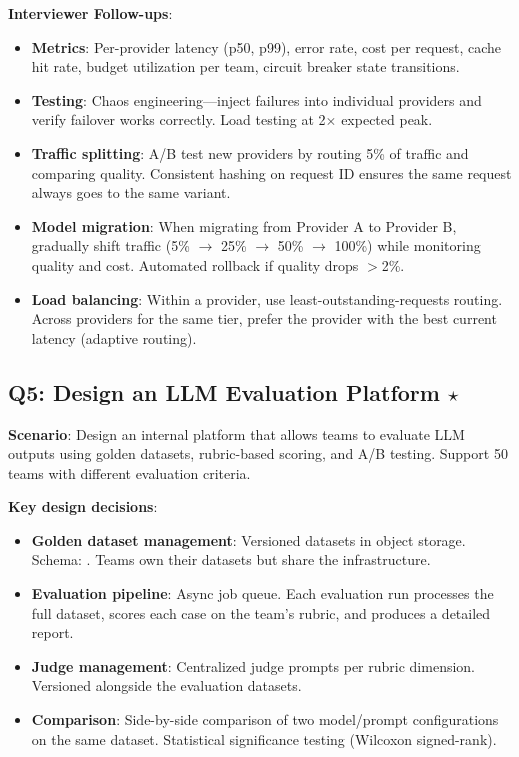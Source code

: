 \textbf{Interviewer Follow-ups}:
\begin{itemize}[leftmargin=*]
    \item \textbf{Metrics}: Per-provider latency (p50, p99), error rate, cost per request, cache hit rate, budget utilization per team, circuit breaker state transitions.
    \item \textbf{Testing}: Chaos engineering---inject failures into individual providers and verify failover works correctly. Load testing at 2$\times$ expected peak.
    \item \textbf{Traffic splitting}: A/B test new providers by routing 5\% of traffic and comparing quality. Consistent hashing on request ID ensures the same request always goes to the same variant.
    \item \textbf{Model migration}: When migrating from Provider A to Provider B, gradually shift traffic (5\% $\to$ 25\% $\to$ 50\% $\to$ 100\%) while monitoring quality and cost. Automated rollback if quality drops $>$2\%.
    \item \textbf{Load balancing}: Within a provider, use least-outstanding-requests routing. Across providers for the same tier, prefer the provider with the best current latency (adaptive routing).
\end{itemize}

\subsection{Q5: Design an LLM Evaluation Platform $\star$}

\textbf{Scenario}: Design an internal platform that allows teams to evaluate LLM outputs using golden datasets, rubric-based scoring, and A/B testing. Support 50 teams with different evaluation criteria.

\textbf{Key design decisions}:
\begin{itemize}[leftmargin=*]
    \item \textbf{Golden dataset management}: Versioned datasets in object storage. Schema: . Teams own their datasets but share the infrastructure.
    \item \textbf{Evaluation pipeline}: Async job queue. Each evaluation run processes the full dataset, scores each case on the team's rubric, and produces a detailed report.
    \item \textbf{Judge management}: Centralized judge prompts per rubric dimension. Versioned alongside the evaluation datasets.
    \item \textbf{Comparison}: Side-by-side comparison of two model/prompt configurations on the same dataset. Statistical significance testing (Wilcoxon signed-rank).
\end{itemize}

